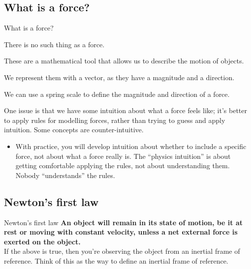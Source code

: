 \documentclass[aspectratio=169,
hyperref={colorlinks,urlcolor=blue}
]{beamer}
\begin{document}
\subsection{What is a force?}
\label{subsec:forces}
\begin{bulletframe}{What is a force?}
\item There is no such thing as a force.
\item These are a mathematical tool that allows us to describe the motion of objects. 
\item We represent them with a vector, as they have a magnitude and a direction.
\item We can use a spring scale to define the magnitude and direction of a force.
\item One issue is that we have some intuition about what a force feels like; it’s better to apply rules for modelling forces, rather than trying to guess and apply intuition. Some concepts are counter-intuitive.
\begin{itemize}
\item With practice, you will develop intuition about whether to include a specific force, not about what a force really is. The ``physics intuition'' is about getting comfortable applying the rules, not about understanding them. Nobody ``understands'' the rules.
\end{itemize}

\end{bulletframe}





\subsection{Newton's first law}
\label{subsec:newtonsfirstlaw}
\begin{frame}{Newton's first law}
\textbf{An object will remain in its state of motion, be it at rest or moving with constant velocity, unless a net external force is exerted on the object.}\\
\vfill
If the above is true, then you're observing the object from an inertial frame of reference. Think of this as the way to define an inertial frame of reference.
\end{frame}


\end{document}

